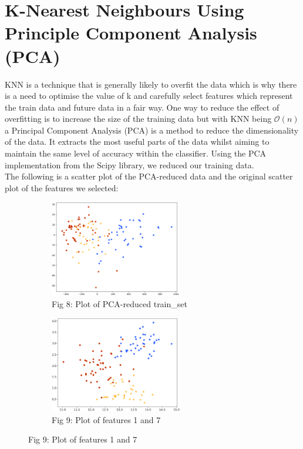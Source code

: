 \documentclass[10pt]{article}
\begin{document}
\section*{K-Nearest Neighbours Using Principle Component Analysis (PCA)}
KNN is a technique that is generally likely to overfit the data which is why there is a need to optimise the value of k and carefully select features which represent the train data and future data in a fair way. One way to reduce the effect of overfitting is to increase the size of the training data but with KNN being $\mathcal{O}(n)$ a Principal Component Analysis (PCA) is a method to reduce the dimensionality of the data. It extracts the most useful parts of the data whilst aiming to maintain the same level of accuracy within the classifier. Using the PCA implementation from the Scipy library, we reduced our training data.\\

\noindent
The following is a scatter plot of the PCA-reduced data and the original scatter plot of the features we selected:


\noindent

\begin{figure}[h!]
\captionsetup[subfigure]{labelformat=empty}
\begin{subfigure}{.5\textwidth}
\centering
\includegraphics[height=4.2cm]{pca.png}
\caption{Fig 8: Plot of PCA-reduced train\_set}
\end{subfigure}%
\begin{subfigure}{.5\textwidth}
\centering
\includegraphics[height=4.2cm]{1and7.png}
\caption{Fig 9: Plot of features 1 and 7}
\end{subfigure}%
\end{figure}
\noindent
\end{document}
